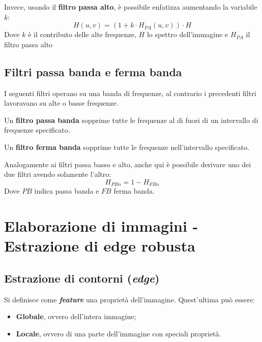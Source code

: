 \documentclass[a4paper]{article}
\begin{document}
	\noindent
	Invece, usando il \textbf{filtro passa alto}, è possibile enfatizza aumentando la variabile $k$:
	\begin{equation*}
		H\left(u,v\right) = \left(1 + k \cdot H_{PA}\left(u,v\right)\right) \cdot H
	\end{equation*}
	Dove $k$ è il contributo delle alte frequenze, $H$ lo spettro dell'immagine e $H_{PA}$ il filtro passa alto
	
	\subsection{Filtri passa banda e ferma banda}
	
	I seguenti filtri operano su una banda di frequenze, al contrario i precedenti filtri lavoravano su alte o basse frequenze.\newline
	
	\noindent
	Un \textcolor{Red3}{\textbf{filtro passa banda}} sopprime tutte le frequenze al di fuori di un intervallo di frequenze specificato.\newline
	
	\noindent
	Un \textcolor{Red3}{\textbf{filtro ferma banda}} sopprime tutte le frequenze nell'intervallo specificato.\newline
	
	\noindent
	Analogamente ai filtri passa basso e alto, anche qui è possibile derivare uno dei due filtri avendo solamente l'altro:
	\begin{equation*}
		H_{PBn} = 1 - H_{FBn}
	\end{equation*}
	Dove $PB$ indica passa banda e $FB$ ferma banda.\newpage
	
	\section{Elaborazione di immagini - Estrazione di edge robusta}
	
	\subsection{Estrazione di contorni (\emph{edge})}
	
	Si definisce come \textbf{\emph{feature}} una proprietà dell'immagine. Quest'ultima può essere:
	\begin{itemize}
		\item \textbf{Globale}, ovvero dell'intera immagine;
		\item \textbf{Locale}, ovvero di una parte dell'immagine con speciali proprietà.
	\end{itemize}
	
\end{document}
